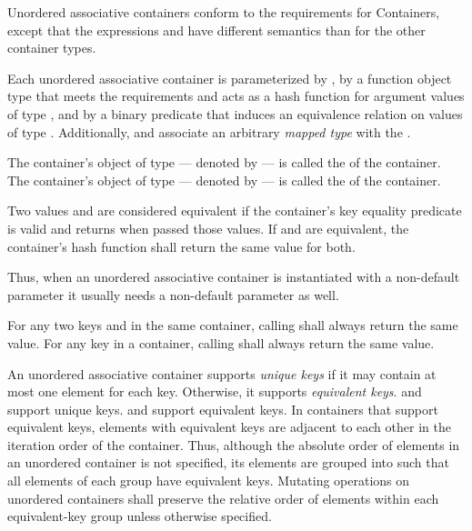 \pnum
{}%
%
%
Unordered associative containers conform to the requirements for
Containers, except that
the expressions
 and  have different semantics than for the other
container types.

\pnum
Each unordered associative container is parameterized by ,
by a function object type  that meets the 
requirements and acts as a hash function for
argument values of type , and by a binary predicate 
that induces an equivalence relation on values of type .
Additionally,  and  associate
an arbitrary \textit{mapped type}  with the .

\pnum
{}%
%
The container's object of type  --- denoted by
 --- is called the  of the
container. The container's object of type  ---
denoted by  --- is called the
 of the container.

\pnum
{}%
Two values  and  are
considered equivalent if the container's
key equality predicate
 is valid and returns
 when passed those values.  If  and
 are equivalent, the container's hash function shall
return the same value for both.
\begin{note} Thus, when an unordered associative container is instantiated with
a non-default  parameter it usually needs a non-default 
parameter as well. \end{note}
For any two keys  and  in the same container,
calling  shall always return the same value.
For any key  in a container, calling 
shall always return the same value.

\pnum
{}%
%
An unordered associative container supports \textit{unique keys} if it
may contain at most one element for each key.  Otherwise, it supports
\textit{equivalent keys}.   and 
support unique keys.  and 
support equivalent keys.  In containers that support equivalent keys,
elements with equivalent keys are adjacent to each other
in the iteration order of the container. Thus, although the absolute order
of elements in an unordered container is not specified, its elements are
grouped into  such that all elements of each
group have equivalent keys. Mutating operations on unordered containers shall
preserve the relative order of elements within each equivalent-key group
unless otherwise specified.

